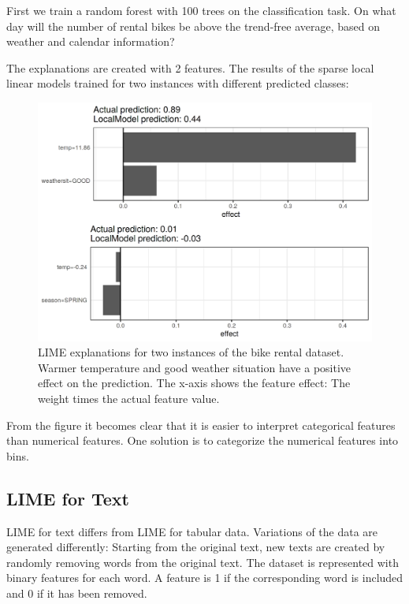 \documentclass[12pt,]{krantz}
\begin{document}
First we train a random forest with 100 trees on the classification
task. On what day will the number of rental bikes be above the
trend-free average, based on weather and calendar information?

The explanations are created with 2 features. The results of the sparse
local linear models trained for two instances with different predicted
classes:

\begin{figure}

{\centering \includegraphics[width=\textwidth]{images/lime-tabular-example-explain-plot-1-1} 

}

\caption{LIME explanations for two instances of the bike rental dataset. Warmer temperature and good weather situation have a positive effect on the prediction. The x-axis shows the feature effect: The weight times the actual feature value.}\label{fig:lime-tabular-example-explain-plot-1}
\end{figure}

From the figure it becomes clear that it is easier to interpret
categorical features than numerical features. One solution is to
categorize the numerical features into bins.

\subsection{LIME for Text}\label{lime-for-text}

LIME for text differs from LIME for tabular data. Variations of the data
are generated differently: Starting from the original text, new texts
are created by randomly removing words from the original text. The
dataset is represented with binary features for each word. A feature is
1 if the corresponding word is included and 0 if it has been removed.
\end{document}
